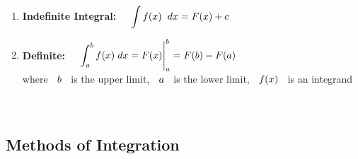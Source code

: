 \documentclass[11pt,a4paper]{article}
\begin{document}
\begin{enumerate}
\item[$\star$] \textbf{Indefinite Integral:} $\hspace{0.4cm}\displaystyle{\int f(x) \hspace{0.2cm}dx = F(x) + c}$\\

\item[$\star$] \textbf{Definite:} $\hspace{0.4cm} \displaystyle{\int^b_a f(x)\hspace{0.1cm}dx = F(x)\Bigg|^b_a = F(b) - F(a)}$\\
where $\hspace{0.2cm} b\hspace{0.2cm}$ is the upper limit, $\hspace{0.2cm}a\hspace{0.2cm}$ is  the lower limit, $\hspace{0.2cm}f(x)\hspace{0.2cm}$ is an integrand\\\\\\
\end{enumerate}













\subsection{Methods of Integration}
\end{document}
